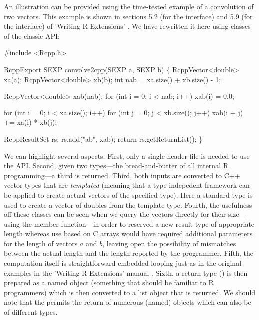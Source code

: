 An illustration can be provided using the time-tested example of a
convolution of two vectors. This example is shown in sections 5.2 (for the
 interface) and 5.9 (for the  interface) of 'Writing
R Extensions' \citep{R:exts}. We have rewritten it here using classes of the
classic  API:

\begin{example}
#include <Rcpp.h>

RcppExport SEXP convolve2cpp(SEXP a, SEXP b) \{
  RcppVector<double> xa(a);
  RcppVector<double> xb(b);
  int nab = xa.size() + xb.size() - 1;

  RcppVector<double> xab(nab);
  for (int i = 0; i < nab; i++) xab(i) = 0.0;

  for (int i = 0; i < xa.size(); i++)
    for (int j = 0; j < xb.size(); j++) 
       xab(i + j) += xa(i) * xb(j);

  RcppResultSet rs;
  rs.add("ab", xab);
  return rs.getReturnList();
\}
\end{example}

We can highlight several aspects. First, only a single header file
 is needed to use the  API.  Second, given two
 types---the bread-and-butter of all internal R programming---a
third is returned.  Third, both inputs are converted to C++ vector types that
are \textsl{templated} (meaning that a type-indepedent framework can be
applied to create actual vectors of the specified type). Here a standard 
type is used to create a vector of doubles from the template type.
Fourth, the usefulness off these classes can be seen when we query the
vectors directly for their size---using the  member function---in
order to reserved a new result type of appropriate length whereas use based
on C arrays would have required additional parameters for the length of
vectors $a$ and $b$, leaving open the possibility of mismatches between the
actual length and the length reported by the programmer.  Fifth, the
computation itself is straightforward embedded looping just as in the
original examples in the 'Writing R Extensions' manual \citep{R:exts}.
Sixth, a return type () is then prepared as a named
object (something that should be familiar to R programmers) which is then
converted to a list object that is returned.  We should note that the
 permits the return of numerous (named) objects which can
also be of different types.

